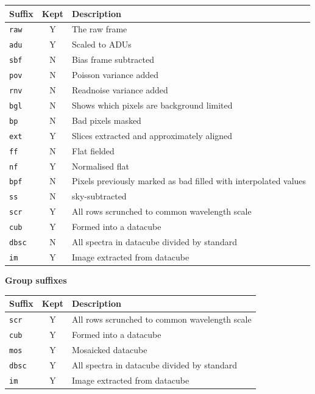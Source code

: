\documentclass[twoside,11pt]{article}
\renewcommand{\_}{\texttt{\symbol{95}}}
\begin{document}
\begin{tabular}{l c l}
\hline
Suffix & Kept & Description \hspace{9cm}  \\
\hline
{\tt \_raw} & Y & The raw frame\\
{\tt \_adu} & Y & Scaled to ADUs\\
{\tt \_sbf} & N & Bias frame subtracted\\
{\tt \_pov} & N & Poisson variance added\\
{\tt \_rnv} & N & Readnoise variance added\\
{\tt \_bgl} & N & Shows which pixels are background limited\\
{\tt \_bp}  & N & Bad pixels masked\\
{\tt \_ext} & Y & Slices extracted and approximately aligned\\
{\tt \_ff}  & N & Flat fielded\\
{\tt \_nf}  & Y & Normalised flat\\
{\tt \_bpf} & N & Pixels previously marked as bad filled with
interpolated values\\
{\tt \_ss}  & N & sky-subtracted\\
{\tt \_scr} & Y & All rows scrunched to common wavelength scale\\
{\tt \_cub} & Y & Formed into a datacube\\
{\tt \_dbsc} & N & All spectra in datacube divided by standard\\
{\tt \_im}  & Y & Image extracted from datacube\\
\hline
\end{tabular}

\vspace{0.5cm}

\textbf{Group suffixes}

\vspace{0.2cm}

\begin{tabular}{l c l}
\hline
Suffix & Kept & Description \hspace{9cm} \\
\hline
{\tt \_scr} & Y & All rows scrunched to common wavelength scale\\
{\tt \_cub} & Y & Formed into a datacube\\
{\tt \_mos} & Y & Mosaicked datacube\\
{\tt \_dbsc} & Y & All spectra in datacube divided by standard\\
{\tt \_im}  & Y & Image extracted from datacube\\
\hline
\end{tabular}
\end{document}

